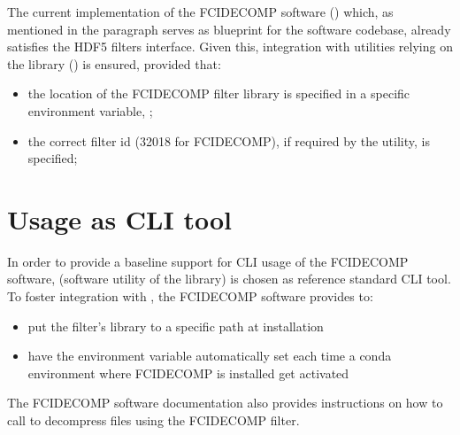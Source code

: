 \documentclass[a4paper,10pt,english]{sphinxmanual}
\begin{document}
\sphinxAtStartPar
The current implementation of the FCIDECOMP software ({\hyperref[\detokenize{introduction:fcidecomp-latest}]{}}) which, as mentioned in the
{\hyperref[\detokenize{canonical_repository:repository-initialization}]{}} paragraph serves as blueprint for the software codebase,
already satisfies the HDF5 filters interface. Given this, integration with utilities relying on the 
library ({\hyperref[\detokenize{introduction:netcdf-c}]{}}) is ensured, provided that:
\begin{itemize}
\item {} 
\sphinxAtStartPar
the location of the FCIDECOMP filter library is specified in a specific environment variable, ;

\item {} 
\sphinxAtStartPar
the correct filter id (32018 for FCIDECOMP), if required by the utility, is specified;

\end{itemize}


\section{Usage as CLI tool}
\label{\detokenize{support_to_usage_patterns:usage-as-cli-tool}}\label{\detokenize{support_to_usage_patterns:id1}}
\sphinxAtStartPar
In order to provide a baseline support for CLI usage of the FCIDECOMP software,  (software utility of the
 library) is chosen as reference standard CLI tool. To foster integration with , the FCIDECOMP
software provides to:
\begin{itemize}
\item {} 
\sphinxAtStartPar
put the filter’s library to a specific path at installation

\item {} 
\sphinxAtStartPar
have the  environment variable automatically set each time a conda environment where FCIDECOMP is installed get activated

\end{itemize}

\sphinxAtStartPar
The FCIDECOMP software documentation also provides instructions on how to call  to decompress files using the
FCIDECOMP filter.
\end{document}
